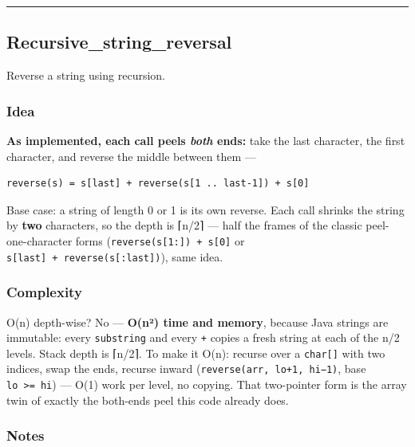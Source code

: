 \documentclass[
  10pt,
  letterpaper,
  onecolumn]{article}
\begin{document}
\begin{center}\rule{0.5\linewidth}{0.5pt}\end{center}

\hypertarget{recursive_string_reversal}{%
\subsection{Recursive\_string\_reversal}\label{recursive_string_reversal}}

Reverse a string using recursion.

\hypertarget{idea-3}{%
\subsubsection{Idea}\label{idea-3}}

\textbf{As implemented, each call peels \emph{both} ends:} take the last
character, the first character, and reverse the middle between them ---

\begin{verbatim}
reverse(s) = s[last] + reverse(s[1 .. last-1]) + s[0]
\end{verbatim}

Base case: a string of length 0 or 1 is its own reverse. Each call
shrinks the string by \textbf{two} characters, so the depth is ⌈n/2⌉ ---
half the frames of the classic peel-one-character forms
(\texttt{reverse(s{[}1:{]})\ +\ s{[}0{]}} or
\texttt{s{[}last{]}\ +\ reverse(s{[}:last{]})}), same idea.

\hypertarget{complexity-3}{%
\subsubsection{Complexity}\label{complexity-3}}

O(n) depth-wise? No --- \textbf{O(n²) time and memory}, because Java
strings are immutable: every \texttt{substring} and every \texttt{+}
copies a fresh string at each of the n/2 levels. Stack depth is ⌈n/2⌉.
To make it O(n): recurse over a \texttt{char{[}{]}} with two indices,
swap the ends, recurse inward (\texttt{reverse(arr,\ lo+1,\ hi−1)}, base
\texttt{lo\ \textgreater{}=\ hi}) --- O(1) work per level, no copying.
That two-pointer form is the array twin of exactly the both-ends peel
this code already does.

\hypertarget{notes-2}{%
\subsubsection{Notes}\label{notes-2}}
\end{document}
